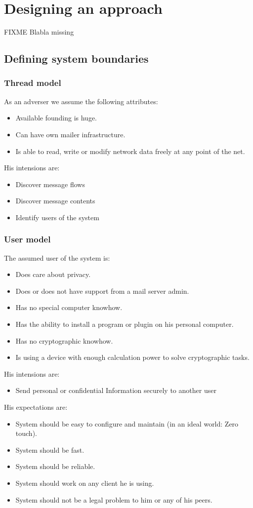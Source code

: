 \chapter{Designing an approach}
FIXME Blabla missing


\section{Defining system boundaries}
\subsection{Thread model}
As an adverser we assume the following attributes:
\begin{itemize}
\item Available founding is huge.
\item Can have own mailer infrastructure.
\item Is able to read, write or modify network data freely at any point of the net.
\end{itemize}
His intensions are:
\begin{itemize}
\item Discover message flows
\item Discover message contents
\item Identify users of the system
\end{itemize}

\subsection{User model}
The assumed user of the system is:
\begin{itemize}
\item Does care about privacy.
\item Does or does not have support from a mail server admin.
\item Has no special computer knowhow.
\item Has the ability to install a program or plugin on his personal computer.
\item Has no cryptographic knowhow.
\item Is using a device with enough calculation power to solve cryptographic tasks.
\end{itemize}

His intensions are:
\begin{itemize}
\item Send personal or confidential Information securely to another user
\end{itemize}
His expectations are:
\begin{itemize}
\item System should be easy to configure and maintain (in an ideal world: Zero touch). 
\item System should be fast.
\item System should be reliable.
\item System should work on any client he is using.
\item System should not be a legal problem to him or any of his peers.
\end{itemize}


